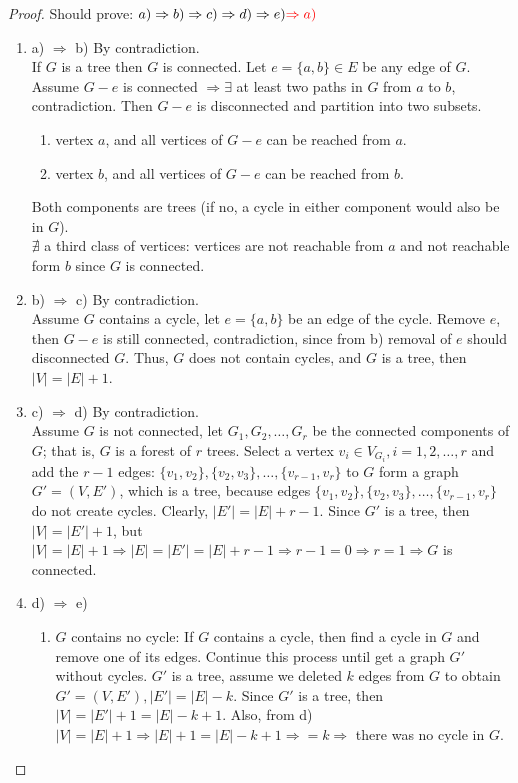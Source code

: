 \documentclass[letter]{book}
\theoremstyle{definition}
\theoremstyle{definition}
\theoremstyle{remark}
\begin{document}
\begin{proof}
    Should prove: $a)\Rightarrow b)\Rightarrow c)\Rightarrow d)\Rightarrow e)\textcolor{red}{\Rightarrow a)}$
    \begin{enumerate}
        \item a) $\Rightarrow$ b) By contradiction.\\
            If $G$ is a tree then $G$ is connected. Let $e=\{a,b\}\in E$ be any edge of $G$.\\
            Assume $G-e$ is connected $\Rightarrow\exists$ at least two paths in $G$ from $a$ to $b$, contradiction. Then $G-e$ is disconnected and partition into two subsets.
            \begin{enumerate}
                \item vertex $a$, and all vertices of $G-e$ can be reached from $a$.
                \item vertex $b$, and all vertices of $G-e$ can be reached from $b$.
            \end{enumerate}
            Both components are trees (if no, a cycle in either component would also be in $G$).\\
            $\nexists$ a third class of vertices: vertices are not reachable from $a$ and not reachable form $b$ since $G$ is connected.
        \item b) $\Rightarrow$ c) By contradiction.\\
            Assume $G$ contains a cycle, let $e=\{a,b\}$ be an edge of the cycle. Remove $e$, then $G-e$ is still connected, contradiction, since from b) removal of $e$ should disconnected $G$. Thus, $G$ does not contain cycles, and $G$ is a tree, then $|V|=|E|+1$.
        \item c) $\Rightarrow$ d) By contradiction.\\
            Assume $G$ is not connected, let $G_1,G_2,\ldots, G_r$ be the connected components of $G$; that is, $G$ is a forest of $r$ trees. Select a vertex $v_i\in V_{G_i},i=1,2,\ldots, r$ and add the $r-1$ edges: $\{v_1,v_2\},\{v_2,v_3\},\ldots, \{v_{r-1},v_r\}$ to $G$ form a graph $G'=(V,E')$, which is a tree, because edges $\{v_1,v_2\},\{v_2,v_3\},\ldots, \{v_{r-1},v_r\}$ do not create cycles. Clearly, $|E'|=|E|+r-1$. Since $G'$ is a tree, then $|V|=|E'|+1$, but $|V|=|E|+1\Rightarrow |E|=|E'|=|E|+r-1\Rightarrow r-1=0\Rightarrow r=1\Rightarrow G$ is connected.
        \item d) $\Rightarrow$ e)
            \begin{enumerate}
                \item $G$ contains no cycle: If $G$ contains a cycle, then find a cycle in $G$ and remove one of its edges. Continue this process until get a graph $G'$ without cycles. $G'$ is a tree, assume we deleted $k$ edges from $G$ to obtain $G'=(V,E'),|E'|=|E|-k$. Since $G'$ is a tree, then $|V|=|E'|+1=|E|-k+1$. Also, from d) $|V|=|E|+1\Rightarrow |E|+1=|E|-k+1\Rightarrow = k\Rightarrow$ there was no cycle in $G$.

\end{enumerate}
\end{enumerate}
\end{proof}
\end{document}
